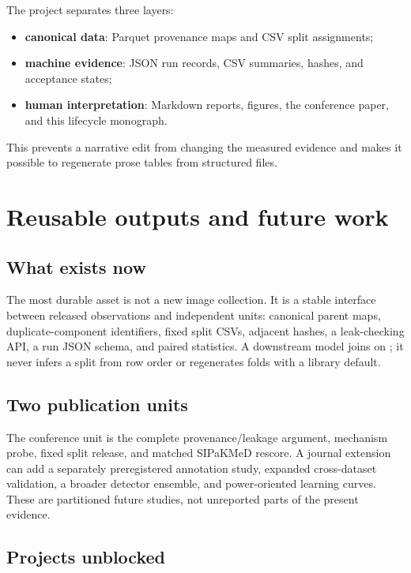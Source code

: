 \documentclass[11pt,oneside]{report}
\newcommand{\artifact}[1]{\path{#1}}
\begin{document}
The project separates three layers:
\begin{itemize}
  \item \textbf{canonical data}: Parquet provenance maps and CSV split assignments;
  \item \textbf{machine evidence}: JSON run records, CSV summaries, hashes, and acceptance states;
  \item \textbf{human interpretation}: Markdown reports, figures, the conference paper, and this lifecycle monograph.
\end{itemize}
This prevents a narrative edit from changing the measured evidence and makes it possible to regenerate prose tables from structured files.

\chapter{Reusable outputs and future work}

\section{What exists now}

The most durable asset is not a new image collection. It is a stable interface between released observations and independent units: canonical parent maps, duplicate-component identifiers, fixed split CSVs, adjacent hashes, a leak-checking API, a run JSON schema, and paired statistics. A downstream model joins on \artifact{crop_id}; it never infers a split from row order or regenerates folds with a library default.

\section{Two publication units}

The conference unit is the complete provenance/leakage argument, mechanism probe, fixed split release, and matched SIPaKMeD rescore. A journal extension can add a separately preregistered annotation study, expanded cross-dataset validation, a broader detector ensemble, and power-oriented learning curves. These are partitioned future studies, not unreported parts of the present evidence.

\section{Projects unblocked}
\end{document}
